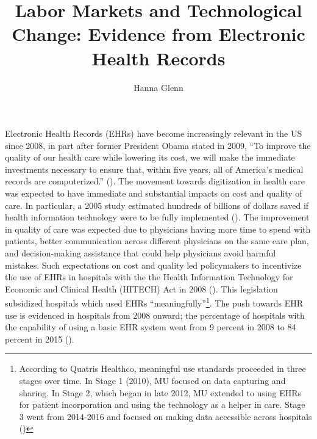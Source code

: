 \documentclass[11pt]{article}
\title{Labor Markets and Technological Change: Evidence from Electronic Health Records}
\author{Hanna Glenn}
\begin{document}
\maketitle



\vspace{1.5cm}

Electronic Health Records (EHRs) have become increasingly relevant in the US since 2008, in part after former President Obama stated in 2009, “To improve the quality of our health care while lowering its cost, we will make the immediate investments necessary to ensure that, within five years, all of America’s medical records are computerized.” (\cite{presquote}). The movement towards digitization in health care was expected to have immediate and substantial impacts on cost and quality of care. In particular, a 2005 study estimated hundreds of billions of dollars saved if health information technology were to be fully implemented (\cite{hillestad2005}). The improvement in quality of care was expected due to physicians having more time to spend with patients, better communication across different physicians on the same care plan, and decision-making assistance that could help physicians avoid harmful mistakes. Such expectations on cost and quality led policymakers to incentivize the use of EHRs in hospitals with the the Health Information Technology for Economic and Clinical Health (HITECH) Act in 2008 (\cite{hitech}). This legislation subsidized hospitals which used EHRs “meaningfully”\footnote{According to Quatris Healthco, meaningful use standards proceeded in three stages over time. In Stage 1 (2010), MU focused on data capturing and sharing. In Stage 2, which began in late 2012, MU extended to using EHRs for patient incorporation and using the technology as a helper in care. Stage 3 went from 2014-2016 and focused on making data accessible across hospitals (\cite{meanuse})}. The push towards EHR use is evidenced in hospitals from 2008 onward; the percentage of hospitals with the capability of using a basic EHR system went from 9 percent in 2008 to 84 percent in 2015 (\cite{stats}).
\end{document}
